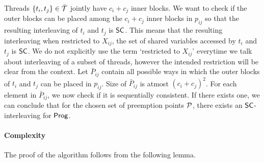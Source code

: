Threads $\{t_i,t_j\} \in \bar{{\mathcal T}}$ jointly have  $c_i+c_j$ inner blocks. We want to check if the outer blocks can be placed among the $c_i+c_j$ inner blocks in $p_{ij}$ so that the resulting interleaving of $t_i$ and $t_j$ is $\mathsf{SC}$. This means that the resulting interleaving when restricted to $X_{ij}$, the set of shared variables accessed by $t_i$ and $t_j$ is $\mathsf{SC}$. We do not explicitly use the term `restricted to $X_{ij}$' everytime we talk about interleaving of a subset of threads, however the intended restriction will be clear from the context.
Let $\bar{P}_{ij}$ contain all possible ways in which the outer blocks of $t_i$ and $t_j$ can be placed in $p_{ij}$. Size of $\bar{P}_{ij}$ is atmost $(c_i+c_j)^2$. For each element in $\bar{P}_{ij}$, we now check if it is sequentially consistent. If there exists one, we can conclude that for the chosen set of preemption points $\mathcal{P}$, there exists an $\mathsf{SC}$-interleaving for $\mathsf{Prog}$. 

\paragraph*{Complexity} 

\smallskip

The proof of the algorithm follows from the following  lemma.


